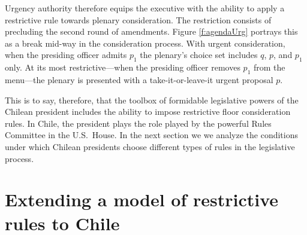 \documentclass[letter,12pt]{article}
\begin{document}
Urgency authority therefore equips the executive with the ability to apply a restrictive rule towards plenary consideration. The restriction consists of precluding the second round of amendments. Figure \ref{f:agendaUrg} portrays this as a break mid-way in the consideration process. With urgent consideration, when the presiding officer admits $p_1$ the plenary's choice set includes $q$, $p$, and $p_1$ only. At its most restrictive---when the presiding officer removes $p_1$ from the menu---the plenary is presented with a take-it-or-leave-it urgent proposal $p$.

This is to say, therefore, that the toolbox of formidable legislative powers of the Chilean president includes the ability to impose restrictive floor consideration rules. In Chile, the president plays the role played by the powerful Rules Committee in the U.S.\ House. In the next section we we analyze the conditions under which  Chilean presidents choose different types of rules in the legislative process. 


\section{Extending a model of restrictive rules to Chile}
\end{document}
